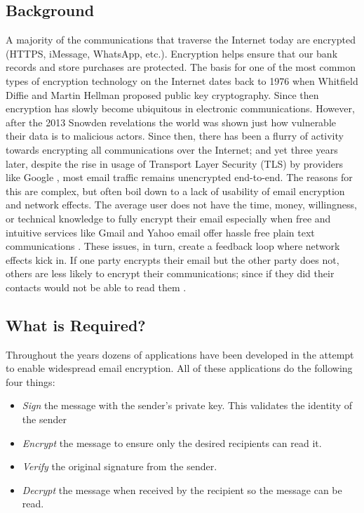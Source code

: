 \documentclass[10pt]{article}
\begin{document}
\begin{multicols}{2}
\section{Background}
\par A majority of the communications that traverse the Internet today are encrypted (HTTPS, iMessage, WhatsApp, etc.). Encryption helps ensure that our bank records and store purchases are protected. The basis for one of the most common types of encryption technology on the Internet dates back to 1976 when Whitfield Diffie and Martin Hellman proposed public key cryptography. Since then encryption has slowly become ubiquitous in electronic communications. However, after the 2013 Snowden revelations the world was shown just how vulnerable their data is to malicious actors. Since then, there has been a flurry of activity towards encrypting all communications over the Internet\cite{wired-encrypted-traffic}; and yet three years later, despite the rise in usage of Transport Layer Security (TLS) by providers like Google \cite{gmail-tls-report}, most email traffic remains unencrypted end-to-end. The reasons for this are complex, but often boil down to a lack of usability of email encryption and network effects. The average user does not have the time, money, willingness, or technical knowledge to fully encrypt their email especially when free and intuitive services like Gmail and Yahoo email offer hassle free plain text communications \cite{garfinkel2005make}. These issues, in turn, create a feedback loop where network effects kick in. If one party encrypts their email but the other party does not, others are less likely to encrypt their communications; since if they did their contacts would not be able to read them \cite{dingledine2006anonymity}.

\subsection{What is Required?}
Throughout the years dozens of applications have been developed in the attempt to enable widespread email encryption. All of these applications do the following four things:

\begin{itemize}
  \item \textit{Sign} the message with the sender's private key. This validates the identity of the sender
  \item \textit{Encrypt} the message to ensure only the desired recipients can read it.
  \item \textit{Verify} the original signature from the sender.
  \item \textit{Decrypt} the message when received by the recipient so the message can be read.
\end{itemize}


\end{multicols}
\end{document}
